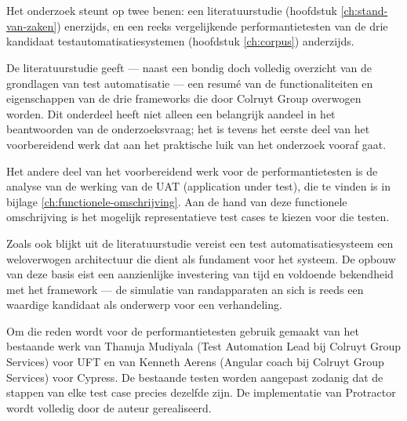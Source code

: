 
\chapter{}
\label{ch:methodologie}


Het onderzoek steunt op twee benen: een literatuurstudie (hoofdstuk \ref{ch:stand-van-zaken}) enerzijds, en een reeks vergelijkende performantietesten van de drie kandidaat testautomatisatiesystemen (hoofdstuk \ref{ch:corpus}) anderzijds.

De literatuurstudie geeft — naast een bondig doch volledig overzicht van de grondlagen van test automatisatie — een resumé van de functionaliteiten en eigenschappen van de drie frameworks die door Colruyt Group overwogen worden. Dit onderdeel heeft niet alleen een belangrijk aandeel in het beantwoorden van de onderzoeksvraag; het is tevens het eerste deel van het voorbereidend werk dat aan het praktische luik van het onderzoek vooraf gaat.


Het andere deel van het voorbereidend werk voor de performantietesten is de analyse van de werking van de UAT (application under test), die te vinden is in bijlage \ref{ch:functionele-omschrijving}. Aan de hand van deze functionele omschrijving is het mogelijk representatieve test cases te kiezen voor die testen.

Zoals ook blijkt uit de literatuurstudie vereist een test automatisatiesysteem een weloverwogen architectuur die dient als fundament voor het systeem. De opbouw van deze basis eist een aanzienlijke investering van tijd en voldoende bekendheid met het framework — de simulatie van randapparaten an sich is reeds een waardige kandidaat als onderwerp voor een verhandeling.

Om die reden wordt voor de performantietesten gebruik gemaakt van het bestaande werk van Thanuja Mudiyala (Test Automation Lead bij Colruyt Group Services) voor UFT en van Kenneth Aerens (Angular coach bij Colruyt Group Services) voor Cypress. De bestaande testen worden aangepast zodanig dat de stappen van elke test case precies dezelfde zijn. De implementatie van Protractor wordt volledig door de auteur gerealiseerd.

